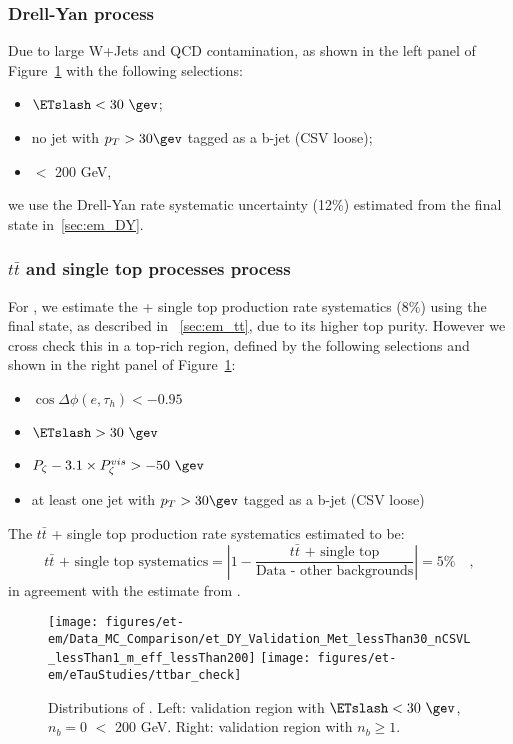 \subsubsection{Drell-Yan process}
Due to large W+Jets and QCD contamination, as shown in the left panel of 
Figure~\ref{fig:et_dy_tt} with the following selections:
\begin{itemize}
  \item $\ETslash<30~\gev$;
  \item no jet with $p_T>30\gev$ tagged as a b-jet (CSV loose);
  \item \meffetau $<$ 200 GeV\quad,
\end{itemize}
we use the Drell-Yan rate systematic uncertainty (12\%) estimated from
the \tetm final state in~\ref{sec:em_DY}.

\subsubsection{$t\bar{t}$ and single top processes process}
For \teth, we estimate the \ttbar + single top production rate
systematics (8\%) using the \tetm final state, as described in
~\ref{sec:em_tt}, due to its higher top purity.  However we cross
check this in a \teth top-rich region, defined by the following
selections and shown in the right panel of Figure~\ref{fig:et_dy_tt}:
\begin{itemize}
  \item $\cos{\Delta \phi (e,\tau_{h})}<-0.95$
  \item $\ETslash>30~\gev$
  \item $P_{\zeta}- 3.1 \times P_{\zeta}^{vis} > -50~\gev$
  \item at least one jet with $p_T>30\gev$ tagged as a b-jet (CSV loose)
\end{itemize}
The $t\bar{t}$ + single top production rate systematics estimated to be:
\begin{equation}\label{eq:et_tt}
\text{$t\bar{t}$ + single top systematics} = \left| 1 - \frac{\text{$t\bar{t}$ + single top}}{\text{Data - other backgrounds}}\right| = 5\%\quad,
\end{equation}
in agreement with the estimate from \tetm.

\begin{figure}\centering
  \texttt{[image: figures/et-em/Data\_MC\_Comparison/et\_DY\_Validation\_Met\_lessThan30\_nCSVL\_lessThan1\_m\_eff\_lessThan200]}
  \texttt{[image: figures/et-em/eTauStudies/ttbar\_check]}
  \caption{\label{fig:et_dy_tt} Distributions of \meffetau. Left:
    validation region with $\ETslash<30~\gev$, $n_b = 0$ \meffetau $<$ 200 GeV.  Right:
    validation region with $n_b\geq1$.}
\end{figure}

